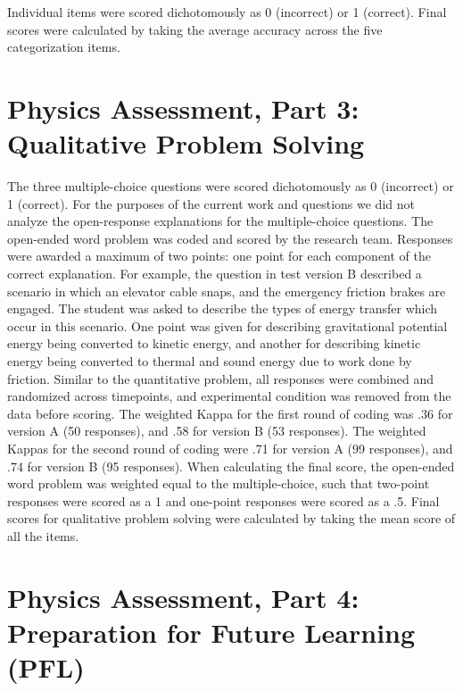 \documentclass[
  letterpaper,
  DIV=11,
  numbers=noendperiod]{scrreprt}
\begin{document}
Individual items were scored dichotomously as 0 (incorrect) or 1
(correct). Final scores were calculated by taking the average accuracy
across the five categorization items.

\section{Physics Assessment, Part 3: Qualitative Problem
Solving}\label{physics-assessment-part-3-qualitative-problem-solving}

The three multiple-choice questions were scored dichotomously as 0
(incorrect) or 1 (correct). For the purposes of the current work and
questions we did not analyze the open-response explanations for the
multiple-choice questions. The open-ended word problem was coded and
scored by the research team. Responses were awarded a maximum of two
points: one point for each component of the correct explanation. For
example, the question in test version B described a scenario in which an
elevator cable snaps, and the emergency friction brakes are engaged. The
student was asked to describe the types of energy transfer which occur
in this scenario. One point was given for describing gravitational
potential energy being converted to kinetic energy, and another for
describing kinetic energy being converted to thermal and sound energy
due to work done by friction. Similar to the quantitative problem, all
responses were combined and randomized across timepoints, and
experimental condition was removed from the data before scoring. The
weighted Kappa for the first round of coding was .36 for version A (50
responses), and .58 for version B (53 responses). The weighted Kappas
for the second round of coding were .71 for version A (99 responses),
and .74 for version B (95 responses). When calculating the final score,
the open-ended word problem was weighted equal to the multiple-choice,
such that two-point responses were scored as a 1 and one-point responses
were scored as a .5. Final scores for qualitative problem solving were
calculated by taking the mean score of all the items.

\section{Physics Assessment, Part 4: Preparation for Future Learning
(PFL)}\label{physics-assessment-part-4-preparation-for-future-learning-pfl}
\end{document}
